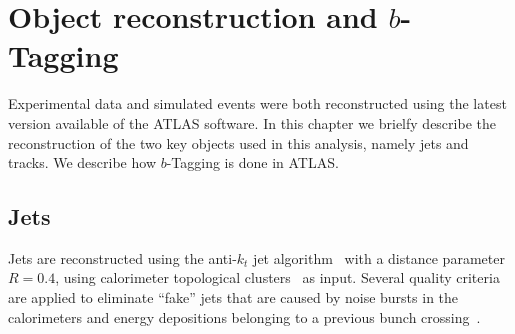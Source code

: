 %
%

\chapter{Object reconstruction and $b$-Tagging }


Experimental data and simulated events were both reconstructed using the latest version available of the ATLAS software. In this chapter we brielfy describe the reconstruction of the two key objects used in this analysis, namely jets and tracks.
We describe how $b$-Tagging is done in ATLAS.


\section{Jets}\label{sec:ObjSelection}


Jets are reconstructed using the anti-$k_t$ jet algorithm~\cite{antiktalg} with a distance parameter $R = 0.4$, using calorimeter topological clusters~\cite{topoClusters} as input.  %
Several quality criteria are applied to eliminate ``fake'' jets that are %
caused by noise bursts in the calorimeters and energy depositions belonging to a previous bunch crossing~\cite{ATLAS-CONF-2012-020}.


